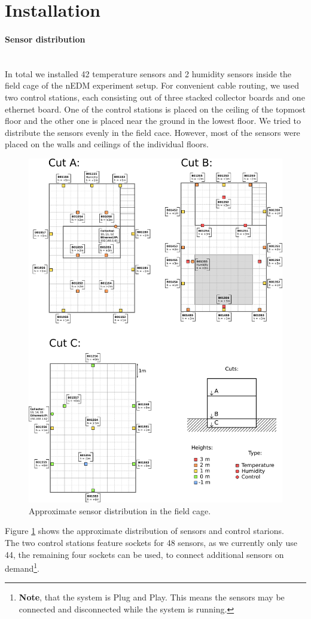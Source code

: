 \documentclass[a4paper]{scrreprt}
\begin{document}
\section{Installation}
\paragraph{Sensor distribution}\hspace{1cm}\\
In total we installed 42 temperature sensors and 2 humidity sensors inside the field
cage of the nEDM experiment setup. For convenient cable routing, we used
two control stations, each consisting out of three stacked collector boards and one
ethernet board. One of the control stations is placed on the ceiling of the
topmost floor and the other one is placed near the ground in the lowest floor. We tried
to distribute the sensors evenly in the field cace. However, most
of the sensors were placed on the walls and ceilings of the individual floors. 
\begin{figure}
	\centering
	\includegraphics[width=\textwidth]{img/installPlan.pdf}
  \caption{Approximate sensor distribution in the field cage.}
	\label{fig:install}
\end{figure}
Figure
\ref{fig:install} shows the approximate distribution of sensors and control starions.\\
The two control stations feature sockets for 48 sensors, as we currently only use 44,
the remaining four sockets can be used, to connect additional sensors on demand\footnote{\textbf{Note}, that
the system is Plug and Play. This means the sensors may be connected and disconnected
while the system is running.}.\\
\end{document}
